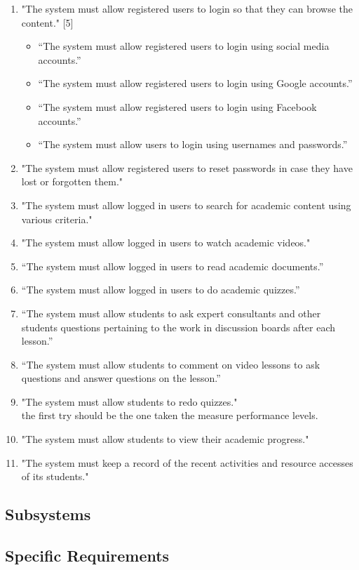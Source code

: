 \documentclass[12pt,a4paper]{article}
\begin{document}
\begin{enumerate}
				\item "The system must allow registered users to login so that they can browse the content." [5]
				\begin{itemize}
					\item “The system must allow registered users to login using social media accounts.”
					\item “The system must allow registered users to login using Google accounts.”
					\item “The system must allow registered users to login using Facebook accounts.”
					\item “The system must allow users to login using usernames and passwords.”
				\end{itemize}				 
			\item "The system must allow registered users to reset passwords in case they have lost or forgotten
them."
			\item "The system must allow logged in users to search for academic content using various criteria."
			\item "The system must allow logged in users to watch academic videos."
			\item “The system must allow logged in users to read academic documents.”
			\item “The system must allow logged in users to do academic quizzes.”
			\item “The system must allow students to ask expert consultants and other students questions pertaining
to the work in discussion boards after each lesson.”
			\item “The system must allow students to comment on video lessons to ask questions and answer
questions on the lesson.”
			\item  "The system must allow students to redo quizzes."\\ the first try should be the one taken the measure performance levels.
			\item "The system must allow students to view their academic progress."
			\item "The system must keep a record of the recent activities and resource accesses of its students."
			\end{enumerate}
		\subsection*{Subsystems}
		\subsection*{Specific Requirements}	
		
\end{document}
